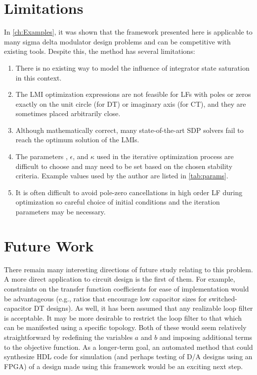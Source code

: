 \section{Limitations}
\label{sec:conclusions-limitations}

In \autoref{ch:Examples}, it was shown that the framework presented here is applicable to many sigma delta modulator design problems and can be competitive with existing tools. Despite this, the method has several limitations:

\begin{enumerate}
	\item There is no existing way to model the influence of integrator state saturation in this context.
	\item The \gls{LMI} optimization expressions are not feasible for \gls{LF}s with poles or zeros exactly on the unit circle (for \gls{DT}) or imaginary axis (for \gls{CT}), and they are sometimes placed arbitrarily close.
	\item Although mathematically correct, many state-of-the-art \gls{SDP} solvers fail to reach the optimum solution of the \gls{LMI}s.
	\item The parameters , $\epsilon$, and $\kappa$ used in the iterative optimization process are difficult to choose and may need to be set based on the chosen stability criteria. Example values used by the author are listed in \autoref{tab:params}.
	\item It is often difficult to avoid pole-zero cancellations in high order \gls{LF} during optimization so careful choice of initial conditions and the iteration parameters may be necessary.
\end{enumerate}

\section{Future Work}
\label{sec:conclusions-future}

There remain many interesting directions of future study relating to this problem. A more direct application to circuit design is the first of them. For example, constraints on the transfer function coefficients for ease of implementation would be advantageous (e.g., ratios that encourage low capacitor sizes for switched-capacitor \gls{DT} designs). As well, it has been assumed that any realizable loop filter is acceptable. It may be more desirable to restrict the loop filter to that which can be manifested using a specific topology. Both of these would seem relatively straightforward by redefining the variables $a$ and $b$ and imposing additional terms to the objective function. As a longer-term goal, an automated method that could synthesize \gls{HDL} code for simulation (and perhaps testing of \gls{D/A} designs using an \gls{FPGA}) of a design made using this framework would be an exciting next step.


